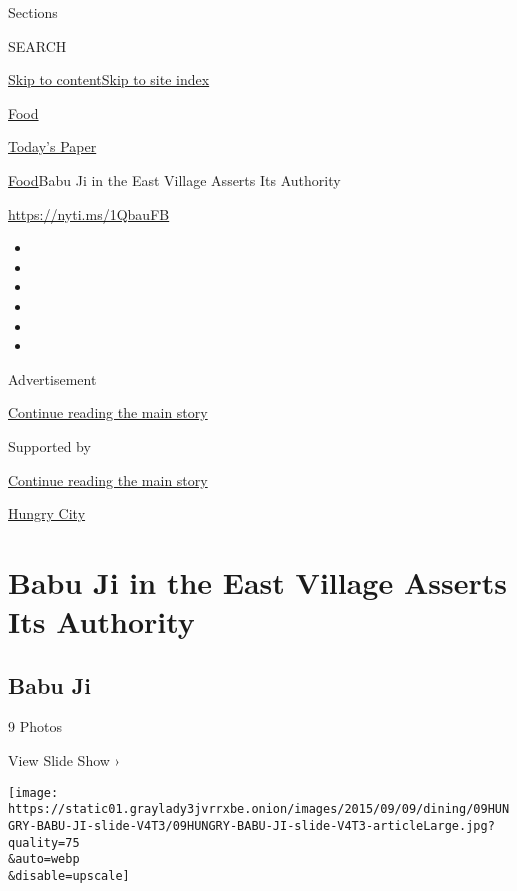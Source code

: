 Sections

SEARCH

\protect\hyperlink{site-content}{Skip to
content}\protect\hyperlink{site-index}{Skip to site index}

\href{https://www.nytimes3xbfgragh.onion/section/food}{Food}

\href{https://myaccount.nytimes3xbfgragh.onion/auth/login?response_type=cookie\&client_id=vi}{}

\href{https://www.nytimes3xbfgragh.onion/section/todayspaper}{Today's
Paper}

\href{/section/food}{Food}\textbar{}Babu Ji in the East Village Asserts
Its Authority

\url{https://nyti.ms/1QbauFB}

\begin{itemize}
\item
\item
\item
\item
\item
\item
\end{itemize}

Advertisement

\protect\hyperlink{after-top}{Continue reading the main story}

Supported by

\protect\hyperlink{after-sponsor}{Continue reading the main story}

\href{/column/hungry-city}{Hungry City}

\hypertarget{babu-ji-in-the-east-village-asserts-its-authority}{%
\section{Babu Ji in the East Village Asserts Its
Authority}\label{babu-ji-in-the-east-village-asserts-its-authority}}

\href{https://www.nytimes3xbfgragh.onion/slideshow/2015/09/09/dining/babu-ji.html}{}

\hypertarget{babu-ji}{%
\subsection{Babu Ji}\label{babu-ji}}

9 Photos

View Slide Show ›

\texttt{[image: https://static01.graylady3jvrrxbe.onion/images/2015/09/09/dining/09HUNGRY-BABU-JI-slide-V4T3/09HUNGRY-BABU-JI-slide-V4T3-articleLarge.jpg?quality=75\\\&auto=webp\\\&disable=upscale]}

